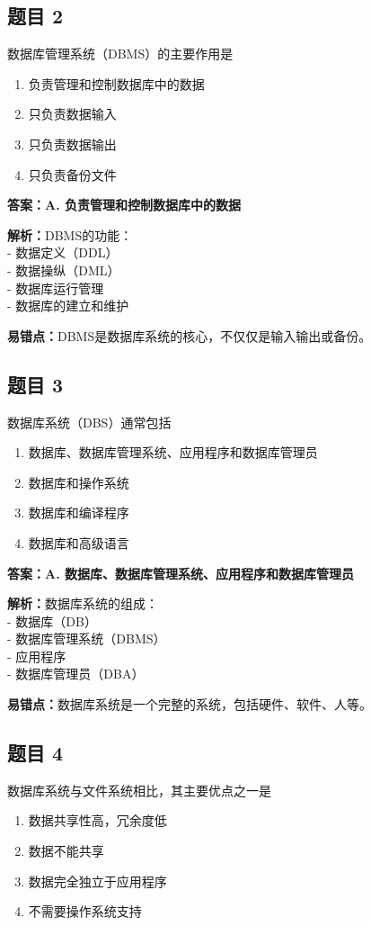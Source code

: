 \documentclass[12pt,a4paper]{ctexart}
\begin{document}
\subsection*{题目 2}
数据库管理系统（DBMS）的主要作用是
\begin{enumerate}[label=\Alph*.]
	\item 负责管理和控制数据库中的数据
	\item 只负责数据输入
	\item 只负责数据输出
	\item 只负责备份文件
\end{enumerate}

\begin{answerbox}
	\textbf{答案：A. 负责管理和控制数据库中的数据}

	\textbf{解析：}DBMS的功能：\\
	- 数据定义（DDL）\\
	- 数据操纵（DML）\\
	- 数据库运行管理\\
	- 数据库的建立和维护

	\textbf{易错点：}DBMS是数据库系统的核心，不仅仅是输入输出或备份。
\end{answerbox}

\subsection*{题目 3}
数据库系统（DBS）通常包括
\begin{enumerate}[label=\Alph*.]
	\item 数据库、数据库管理系统、应用程序和数据库管理员
	\item 数据库和操作系统
	\item 数据库和编译程序
	\item 数据库和高级语言
\end{enumerate}

\begin{answerbox}
	\textbf{答案：A. 数据库、数据库管理系统、应用程序和数据库管理员}

	\textbf{解析：}数据库系统的组成：\\
	- 数据库（DB）\\
	- 数据库管理系统（DBMS）\\
	- 应用程序\\
	- 数据库管理员（DBA）

	\textbf{易错点：}数据库系统是一个完整的系统，包括硬件、软件、人等。
\end{answerbox}

\subsection*{题目 4}
数据库系统与文件系统相比，其主要优点之一是
\begin{enumerate}[label=\Alph*.]
	\item 数据共享性高，冗余度低
	\item 数据不能共享
	\item 数据完全独立于应用程序
	\item 不需要操作系统支持
\end{enumerate}
\end{document}

